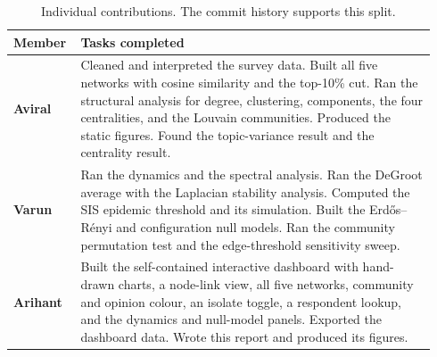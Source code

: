 \documentclass[11pt,a4paper]{article}
\begin{document}
\begin{table}[!ht]
\centering\small
\begin{tabular}{@{}p{0.13\linewidth}p{0.81\linewidth}@{}}
\toprule
\sffamily\bfseries Member & \sffamily\bfseries Tasks completed \\
\midrule
\textbf{Aviral} &
Cleaned and interpreted the survey data. Built all five networks with cosine
similarity and the top-10\% cut. Ran the structural analysis for degree,
clustering, components, the four centralities, and the Louvain communities. Produced the
static figures. Found the topic-variance result and the centrality result. \\
\addlinespace
\textbf{Varun} &
Ran the dynamics and the spectral analysis. Ran the DeGroot average with the
Laplacian stability analysis. Computed the SIS epidemic threshold and its
simulation. Built the Erd\H{o}s--R\'enyi and configuration null models. Ran the
community permutation test and the edge-threshold sensitivity sweep. \\
\addlinespace
\textbf{Arihant} &
Built the self-contained interactive dashboard with hand-drawn charts, a node-link
view, all five networks, community and opinion colour, an isolate toggle, a
respondent lookup, and the dynamics and null-model panels. Exported the dashboard
data. Wrote this report and produced its figures. \\
\bottomrule
\end{tabular}
\caption{Individual contributions. The commit history supports this split.}
\label{tab:contrib}
\end{table}
\end{document}
